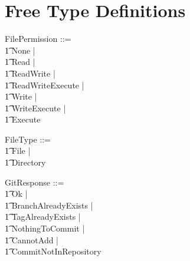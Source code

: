 \section{Free Type Definitions}

\begin{zed}
  FilePermission ::= \\
  \t1 None | \\
  \t1 Read | \\
  \t1 ReadWrite | \\
  \t1 ReadWriteExecute | \\
  \t1 Write | \\
  \t1 WriteExecute | \\
  \t1 Execute
\end{zed}

\begin{zed}
  FileType ::= \\
  \t1 File | \\
  \t1 Directory
\end{zed}

\begin{zed}
  GitResponse ::= \\
  \t1 Ok | \\
  \t1 BranchAlreadyExists | \\
  \t1 TagAlreadyExists | \\
  \t1 NothingToCommit | \\
  \t1 CannotAdd | \\
  \t1 CommitNotInRepository
\end{zed}


